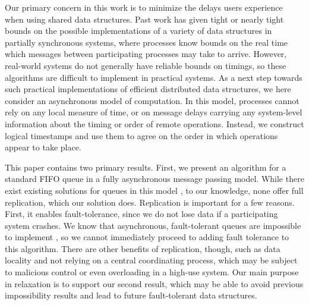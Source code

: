 \documentclass[a4paper,anonymous,USenglish]{lipics-v2021}
\theoremstyle{definition}
\begin{document}
Our primary concern in this work is to minimize the delays users experience when using shared data structures.  Past work has given tight or nearly tight bounds on the possible implementations of a variety of data structures \cite{Kosa99,WangTalmageLeeWelch18} in partially synchronous systems, where processes know bounds on the real time which messages between participating processes may take to arrive.  However, real-world systems do not generally have reliable bounds on timings, so these algorithms are difficult to implement in practical systems.  As a next step towards such practical implementations of efficient distributed data structures, we here consider an asynchronous model of computation.  In this model, processes cannot rely on any local measure of time, or on message delays carrying any system-level information about the timing or order of remote operations.  Instead, we construct logical timestamps and use them to agree on the order in which operations appear to take place.

This paper contains two primary results.  First, we present an algorithm for a standard FIFO queue in a fully asynchronous message passing model. While there exist existing solutions for queues in this model \cite{Lynch96}, to our knowledge, none offer full replication, which our solution does.  Replication is important for a few reasons.  First, it enables fault-tolerance, since we do not lose data if a participating system crashes.  We know that asynchronous, fault-tolerant queues are impossible to implement \cite{FischerLynchPaterson85, Herlihy91}, so we cannot immediately proceed to adding fault tolerance to this algorithm.  There are other benefits of replication, though, such as data locality and not relying on a central coordinating process, which may be subject to malicious control or even overloading in a high-use system.  Our main purpose in relaxation is to support our second result, which may be able to avoid previous impossibility results and lead to future fault-tolerant data structures.
\end{document}
